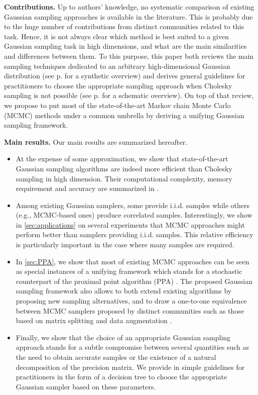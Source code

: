 \documentclass[nohypdvips,onefignum,onetabnum]{siamart171218}
\begin{document}
\noindent\textbf{Contributions.}
Up to authors' knowledge, no systematic comparison of existing Gaussian sampling approaches is available in the literature. This is probably due to the huge number of contributions from distinct communities related to this task.
Hence, it is not always clear which method is best suited to a given Gaussian sampling task in high dimensions, and what are the main similarities and differences between them.
To this purpose, this paper both reviews the main sampling techniques dedicated to an arbitrary high-dimensional Gaussian distribution (see  p.\pageref{table:overview} for a synthetic overview) and derives general guidelines for practitioners to choose the appropriate sampling approach when Cholesky sampling is not possible (see  p.\pageref{fig:guidelines} for a schematic overview).
On top of that review, we propose to put most of the state-of-the-art Markov chain Monte Carlo (MCMC) methods under a common umbrella by deriving a unifying Gaussian sampling framework.

\noindent\textbf{Main results.}
Our main results are summarized hereafter.
\begin{itemize}

    \item At the expense of some approximation, we show that state-of-the-art Gaussian sampling algorithms are indeed more efficient than Cholesky sampling in high dimension.
    Their computational complexity, memory requirement and accuracy are summarized in .
    
    \item Among existing Gaussian samplers, some provide i.i.d. samples while others (e.g., MCMC-based ones) produce correlated samples.
    Interestingly, we show in \cref{sec:applications} on several experiments that MCMC approaches might perform better than samplers providing i.i.d. samples.
    This relative efficiency is particularly important in the case where many samples are required.
    
    \item In \cref{sec:PPA}, we show that most of existing MCMC approaches can be seen as special instances of a unifying framework which stands for a stochastic counterpart of the proximal point algorithm (PPA) \cite{Rockafellar1976}.
    The proposed Gaussian sampling framework also allows to both extend existing algorithms by proposing new sampling alternatives, and to draw a one-to-one equivalence between MCMC samplers proposed by distinct communities such as those based on matrix splitting \cite{Johnson2013,Fox2017} and data augmentation \cite{Marnissi2018,Marnissi2019}.
    
    \item Finally, we show that the choice of an appropriate Gaussian sampling approach stands for a subtle compromise between several quantities such as the need to obtain accurate samples or the existence of a natural decomposition of the precision matrix.
    We provide in  simple guidelines for practitioners in the form of a decision tree to choose the appropriate Gaussian sampler based on these parameters.
    
\end{itemize}
\end{document}
